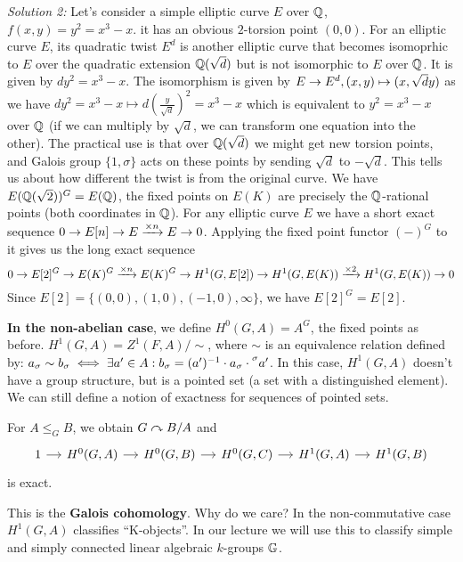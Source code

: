 \begin{outline}
    \1 \textit{Solution 2:} Let's consider a simple elliptic curve $E$ over $\mathbb{Q}$, $f(x,y)=y^2=x^3-x$. it has an obvious $2$-torsion point $(0,0)$. For an elliptic curve $E$, its quadratic twist $E^d$ is another elliptic curve that becomes isomoprhic to $E$ over the quadratic extension $\mathbb{Q}(\sqrt{d})$ but is not isomorphic to $E$ over $\mathbb{Q}$. It is given by $dy^2=x^3-x$. The isomorphism is given by $E\rightarrow E^d, (x,y)\mapsto (x,\sqrt{d}y)$ as we have $dy^2=x^3-x \mapsto d(\frac{y}{\sqrt{d}})^2=x^3-x$ which is equivalent to $y^2=x^3-x$ over $\mathbb{Q}$ (if we can multiply by $\sqrt{d}$, we can transform one equation into the other). The practical use is that over $\mathbb{Q}(\sqrt{d})$ we might get new torsion points, and Galois group $\{1,\sigma\}$ acts on these points by sending $\sqrt{d}$ to $-\sqrt{d}$. This tells us about how different the twist is from the original curve. 
        \2 We have $E(\mathbb{Q}(\sqrt{2}))^G=E(\mathbb{Q})$, the fixed points on $E(K)$ are precisely the $\mathbb{Q}$-rational points (both coordinates in $\mathbb{Q}$). For any elliptic curve $E$ we have a short exact sequence $0\rightarrow E[n] \rightarrow E \xrightarrow[]{\times n} E\rightarrow 0$. Applying the fixed point functor $(-)^G$ to it gives us the long exact sequence 
        $$0\rightarrow E[2]^G \rightarrow E(K)^G \xrightarrow[]{\times n} E(K)^G \rightarrow H^1(G,E[2])\rightarrow H^1(G,E(K))\xrightarrow[]{\times 2} H^1(G,E(K))\rightarrow 0$$
        Since $E[2]=\{(0,0),(1,0),(-1,0),\infty\}$, we have $E[2]^G=E[2]$.
    
    \1 \textbf{In the non-abelian case}, we define 
        \2 $H^0(G,A)=A^G$, the fixed points as before. 
        \2 $H^1(G,A)=Z^1(F,A)/\sim$, where $\sim$ is an equivalence relation defined by: $a_\sigma \sim b_\sigma \iff \exists a' \in A : b_\sigma = (a')^{-1} \cdot a_\sigma \cdot \prescript{\sigma}{}{a'}$. 
    \1[] In this case, $H^1(G,A)$ doesn't have a group structure, but is a pointed set (a set with a distinguished element). We can still define a notion of exactness for sequences of pointed sets.

\begin{proposition}
    For $A\leq_G B$, we obtain $G\curvearrowright B/A$ and 
    $$\begin{tikzcd}[column sep=small]
    1 \arrow[r] & H^0(G,A) \arrow[r] & H^0(G,B) \arrow[r] & H^0(G,C) \arrow[r] & H^1(G,A) \arrow[r] & H^1(G,B)
    \end{tikzcd}$$
    is exact.
\end{proposition}

This is the \textbf{Galois cohomology}. Why do we care? In the non-commutative case $H^1(G,A)$ classifies \enquote{K-objects}. In our lecture we will use this to classify simple and simply connected linear algebraic $k$-groups $\mathbb{G}$.

\end{outline}

